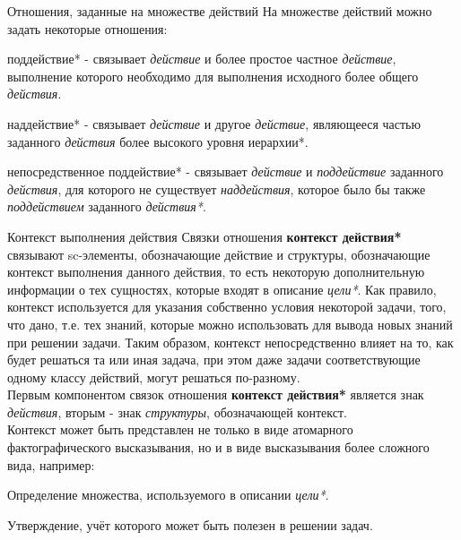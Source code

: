 \begin{frame}{Отношения, заданные на множестве действий}
    На множестве действий можно задать некоторые отношения:
    \begin{textitemize}
        \item поддействие* - связывает \textit{действие} и более простое частное \textit{действие}, выполнение которого необходимо для выполнения исходного более общего \textit{действия}.
        \item наддействие* - связывает \textit{действие} и другое \textit{действие}, являющееся частью заданного \textit{действия} более высокого уровня иерархии*.
        \item непосредственное поддействие* - связывает \textit{действие} и \textit{поддействие} заданного \textit{действия}, для которого не существует \textit{наддействия}, которое было бы также \textit{поддействием} заданного \textit{действия*}.
    \end{textitemize}
\end{frame}

\begin{frame}{\large Контекст выполнения действия}
\vspace{30}
    Связки отношения \textbf{контекст действия*} связывают sc-элементы, обозначающие действие и структуры, обозначающие контекст выполнения данного действия, то есть некоторую дополнительную информации о тех сущностях, которые входят в описание \textit{цели*}. Как правило, контекст используется для указания собственно условия некоторой задачи, того, что дано, т.е. тех знаний, которые можно использовать для вывода новых знаний при решении задачи. Таким образом, контекст непосредственно влияет на то, как будет решаться та или иная задача, при этом даже задачи соответствующие одному классу действий, могут решаться по-разному.\\
    Первым компонентом связок отношения \textbf{контекст действия*} является знак \textit{действия}, вторым - знак \textit{структуры}, обозначающей контекст.\\
    Контекст может быть представлен не только в виде атомарного фактографического высказывания, но и в виде высказывания более сложного вида, например:
    \begin{textitemize}
        \item Определение множества, используемого в описании \textit{цели*}.
        \item Утверждение, учёт которого может быть полезен в решении задач.
    \end{textitemize}
\end{frame}

